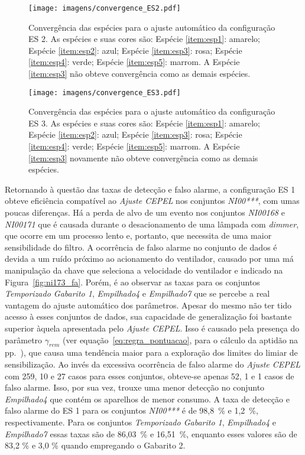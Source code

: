 \begin{figure}[!htb]
\centering
\texttt{[image: imagens/convergence\_ES2.pdf]}
\caption[Convergência das espécies para o ajuste automático da
configuração ES 2.]{Convergência das espécies para o ajuste automático da
configuração ES 2. As espécies e suas cores são: Espécie \ref{item:esp1}:
amarelo; Espécie \ref{item:esp2}: azul; Espécie \ref{item:esp3}: rosa;
Espécie \ref{item:esp4}: verde; Espécie \ref{item:esp5}: marrom. A
Espécie \ref{item:esp3} não obteve convergência como as demais
espécies.}
\label{fig:convergencia_es_2}
\end{figure}

\begin{figure}[!htb]
\centering
\texttt{[image: imagens/convergence\_ES3.pdf]}
\caption[Convergência das espécies para o ajuste automático da
configuração ES 3.]{Convergência das espécies para o ajuste automático da
configuração ES 3. As espécies e suas cores são: Espécie \ref{item:esp1}:
amarelo; Espécie \ref{item:esp2}: azul; Espécie \ref{item:esp3}: rosa;
Espécie \ref{item:esp4}: verde; Espécie \ref{item:esp5}: marrom. A
Espécie \ref{item:esp3} novamente não obteve convergência como as
demais espécies.}
\label{fig:convergencia_es_3}
\end{figure}

Retornando à questão das taxas de detecção e falso alarme, a
configuração ES 1 obteve eficiência compatível ao \emph{Ajuste CEPEL}
nos conjuntos \emph{NI00***}, com umas poucas diferenças. Há a perda
de alvo de um evento nos conjuntos \emph{NI00168} e \emph{NI00171} que
é causada durante o desacionamento de uma lâmpada com \emph{dimmer},
que ocorre em um processo lento e, portanto, que necessita de uma
maior sensibilidade do filtro. A ocorrência de falso alarme no
conjunto de dados é devida a um ruído próximo ao acionamento do
ventilador, causado por uma má manipulação da chave que seleciona a
velocidade do ventilador e indicado na Figura~\ref{fig:ni173_fa}.
Porém, é ao observar as taxas para os conjuntos \emph{Temporizado
Gabarito 1}, \emph{Empilhado4} e \emph{Empilhado7} que se percebe a
real vantagem do ajuste automático dos parâmetros. Apesar do mesmo não
ter tido acesso à esses conjuntos de dados, sua capacidade de
generalização foi bastante superior àquela apresentada pelo
\emph{Ajuste CEPEL}. Isso é causado pela presença do parâmetro
$\gamma_{rem}$ (ver equação~\ref{eq:regra_pontuacao}, para o cálculo
da aptidão na pp.~\pageref{eq:regra_pontuacao}), que causa uma
tendência maior para a exploração dos limites do limiar de
sensibilização. Ao invés da excessiva ocorrência de falso alarme do
\emph{Ajuste CEPEL} com 259, 10 e 27 casos para esses conjuntos,
obteve-se apenas 52, 1 e 1 casos de falso alarme.  Isso, por sua vez,
trouxe uma menor detecção no conjunto \emph{Empilhado4} que contém os
aparelhos de menor consumo. A taxa de detecção e falso alarme do ES 1
para os conjuntos \emph{NI00***} é de 98,8~\% e 1,2~\%,
respectivamente. Para os conjuntos \emph{Temporizado Gabarito 1},
\emph{Empilhado4} e \emph{Empilhado7} essas taxas são de 86,03~\% e 
16,51~\%, enquanto esses valores são de 83,2 \% e 3,0 \% quando
empregando o Gabarito 2.

